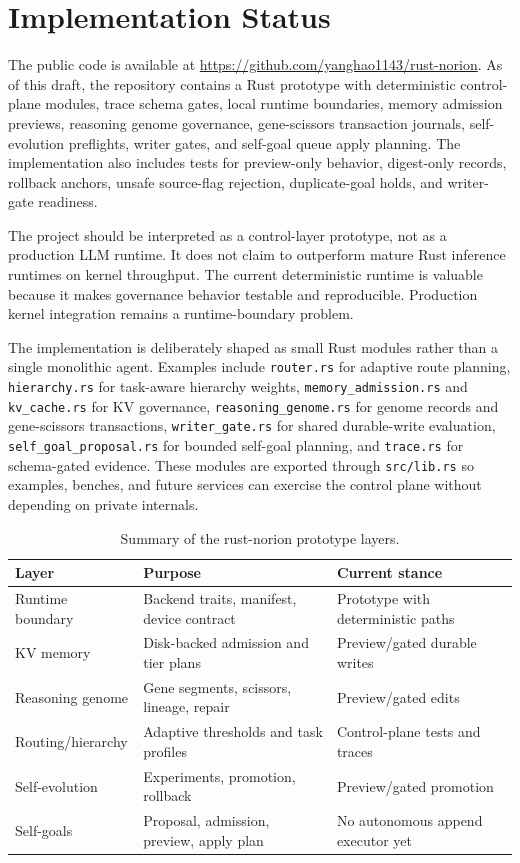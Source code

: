 \documentclass[10pt]{article}
\begin{document}
\section{Implementation Status}

The public code is available at
\url{https://github.com/yanghao1143/rust-norion}. As of this draft, the
repository contains a Rust prototype with deterministic control-plane modules,
trace schema gates, local runtime boundaries, memory admission previews,
reasoning genome governance, gene-scissors transaction journals, self-evolution
preflights, writer gates, and self-goal queue apply planning. The implementation
also includes tests for preview-only behavior, digest-only records, rollback
anchors, unsafe source-flag rejection, duplicate-goal holds, and writer-gate
readiness.

The project should be interpreted as a control-layer prototype, not as a
production LLM runtime. It does not claim to outperform mature Rust inference
runtimes on kernel throughput. The current deterministic runtime is valuable
because it makes governance behavior testable and reproducible. Production
kernel integration remains a runtime-boundary problem.

The implementation is deliberately shaped as small Rust modules rather than a
single monolithic agent. Examples include \texttt{router.rs} for adaptive route
planning, \texttt{hierarchy.rs} for task-aware hierarchy weights,
\texttt{memory\_admission.rs} and \texttt{kv\_cache.rs} for KV governance,
\texttt{reasoning\_genome.rs} for genome records and gene-scissors transactions,
\texttt{writer\_gate.rs} for shared durable-write evaluation,
\texttt{self\_goal\_proposal.rs} for bounded self-goal planning, and
\texttt{trace.rs} for schema-gated evidence. These modules are exported through
\texttt{src/lib.rs} so examples, benches, and future services can exercise the
control plane without depending on private internals.

\begin{table}[t]
\centering
\small
\begin{tabular}{lll}
\toprule
Layer & Purpose & Current stance \\
\midrule
Runtime boundary & Backend traits, manifest, device contract & Prototype with deterministic paths \\
KV memory & Disk-backed admission and tier plans & Preview/gated durable writes \\
Reasoning genome & Gene segments, scissors, lineage, repair & Preview/gated edits \\
Routing/hierarchy & Adaptive thresholds and task profiles & Control-plane tests and traces \\
Self-evolution & Experiments, promotion, rollback & Preview/gated promotion \\
Self-goals & Proposal, admission, preview, apply plan & No autonomous append executor yet \\
\bottomrule
\end{tabular}
\caption{Summary of the rust-norion prototype layers.}
\end{table}
\end{document}
